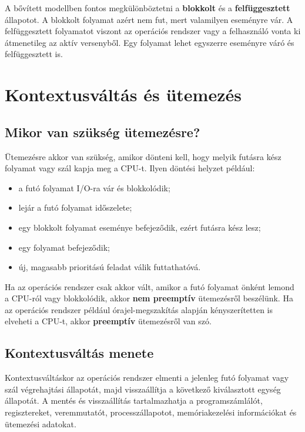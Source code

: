 \begin{center}

\end{center}



A bővített modellben fontos megkülönböztetni a \textbf{blokkolt} és a \textbf{felfüggesztett} állapotot. A blokkolt folyamat azért nem fut, mert valamilyen eseményre vár. A felfüggesztett folyamatot viszont az operációs rendszer vagy a felhasználó vonta ki átmenetileg az aktív versenyből. Egy folyamat lehet egyszerre eseményre váró és felfüggesztett is.

\section{Kontextusváltás és ütemezés}

\subsection{Mikor van szükség ütemezésre?}

Ütemezésre akkor van szükség, amikor dönteni kell, hogy melyik futásra kész folyamat vagy szál kapja meg a CPU-t. Ilyen döntési helyzet például:

\begin{itemize}
  \item a futó folyamat I/O-ra vár és blokkolódik;
  \item lejár a futó folyamat időszelete;
  \item egy blokkolt folyamat eseménye befejeződik, ezért futásra kész lesz;
  \item egy folyamat befejeződik;
  \item új, magasabb prioritású feladat válik futtathatóvá.
\end{itemize}

Ha az operációs rendszer csak akkor vált, amikor a futó folyamat önként lemond a CPU-ról vagy blokkolódik, akkor \textbf{nem preemptív} ütemezésről beszélünk. Ha az operációs rendszer például órajel-megszakítás alapján kényszerítetten is elveheti a CPU-t, akkor \textbf{preemptív} ütemezésről van szó.

\subsection{Kontextusváltás menete}

Kontextusváltáskor az operációs rendszer elmenti a jelenleg futó folyamat vagy szál végrehajtási állapotát, majd visszaállítja a következő kiválasztott egység állapotát. A mentés és visszaállítás tartalmazhatja a programszámlálót, regisztereket, veremmutatót, processzállapotot, memóriakezelési információkat és ütemezési adatokat.

